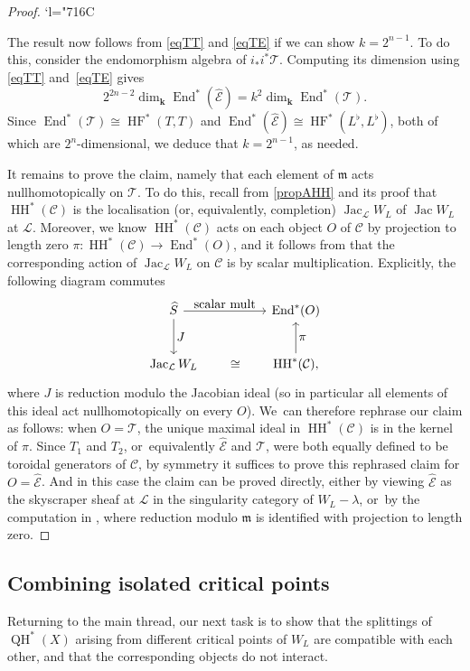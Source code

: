 \documentclass[JEP,XML,SOM,Unicode,NoEqCountersInSection,NoFloatCountersInSection,published]{cedram}
\newcommand{\Changelback}{\mathcode`l="716C}
\let\ts\textstyle
\theoremstyle{definition}
\newcommand{\LL}{L^\flat}
\newcommand{\hatS}{\widehat{S}}
\newcommand{\hatE}{\widehat{\calE}}
\newcommand{\calC}{\mathcal{C}}
\newcommand{\calE}{\mathcal{E}}
\newcommand{\calL}{\mathcal{L}}
\newcommand{\calT}{\mathcal{T}}
\newcommand{\kk}{{\boldsymbol{k}}}
\newcommand{\m}{\mathfrak{m}}
\newcommand{\HH}{\operatorname{HH}}
\newcommand{\HF}{\operatorname{HF}}
\newcommand{\End}{\operatorname{End}}
\newcommand{\QH}{\operatorname{QH}}
\newcommand{\Jac}{\operatorname{Jac}}
\begin{document}
\begin{proof}
\Changelback

The result now follows from \eqref{eqTT} and \eqref{eqTE} if we can show $k = 2^{n-1}$. To do this, consider the endomorphism algebra of $i_*i^*\calT$. Computing its dimension using \eqref{eqTT} and~\eqref{eqTE} gives
\[
2^{2n-2} \dim_\kk \End^*(\hatE) = k^2 \dim_\kk \End^*(\calT).
\]
Since $\End^*(\calT) \cong \HF^*(T, T)$ and $\End^*(\hatE) \cong \HF^*(\LL, \LL)$, both of which are $2^n$\nobreakdash-dimen\-sional, we deduce that $k = 2^{n-1}$, as needed.

It remains to prove the claim, namely that each element of $\m$ acts nullhomotopically on $\calT$. To do this, recall from \cref{propAHH} and its proof that $\HH^*(\calC)$ is the localisation (or, equivalently, completion) $\Jac_\calL W_L$ of $\Jac W_L$ at $\calL$. Moreover, we know $\HH^*(\calC)$ acts on each object $O$ of $\calC$ by projection to length zero $\pi : \HH^*(\calC) \to \End^*(O)$, and it follows from \cite[p.\,266]{Dyckerhoff} that the corresponding action of $\Jac_\calL W_L$ on $\calC$ is by scalar multiplication. Explicitly, the following diagram commutes
\[
\begin{tikzcd}[column sep=5em, row sep=2.5em]
\hatS \arrow[r, "\ts\text{scalar mult}"] \arrow[d, "\ts J"] & \End^*(O) \\
\Jac_\calL W_L \arrow[r, phantom, "\cong"] & \HH^*(\calC), \arrow[u, swap, "\ts\pi"]
\end{tikzcd}
\]
where $J$ is reduction modulo the Jacobian ideal (so in particular all elements of this ideal act nullhomotopically on every $O$). We~can therefore rephrase our claim as follows: when $O = \calT$, the unique maximal ideal in $\HH^*(\calC)$ is in the kernel of $\pi$. Since $T_1$ and $T_2$, or~equivalently $\hatE$ and $\calT$, were both equally defined to be toroidal generators of $\calC$, by symmetry it suffices to prove this rephrased claim for $O = \hatE$. And in this case the claim can be proved directly, either by viewing $\hatE$ as the skyscraper sheaf at $\calL$ in the singularity category of $W_L - \lambda$, or~by the computation in \cite[\S 5]{SmithSuperfiltered}, where reduction modulo $\m$ is identified with projection to length zero.
\end{proof}

\subsection{Combining isolated critical points}
\label{sscCombining}

Returning to the main thread, our next task is to show that the splittings of $\QH^*(X)$ arising from different critical points of $W_L$ are compatible with each other, and that the corresponding objects do not interact.
\end{document}
